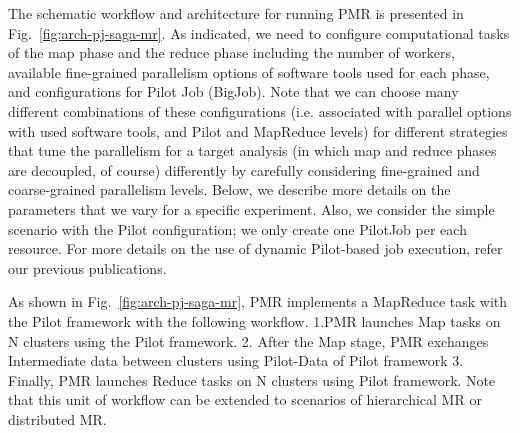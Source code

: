 \documentclass{acm_proc_article-sp}
\begin{document}
The schematic workflow and architecture for running PMR is presented in Fig.~\ref{fig:arch-pj-saga-mr}.  As indicated, we need to configure computational tasks of the map phase and the reduce phase including the number of workers, available fine-grained parallelism options of software tools used for each phase, and configurations for Pilot Job (BigJob).  Note that we can choose many different combinations of these configurations (i.e. associated with parallel options with used software tools, and Pilot and MapReduce levels) for different strategies that tune the parallelism for a target analysis (in which map and reduce phases are decoupled, of course) differently by carefully considering fine-grained and coarse-grained parallelism levels.  Below, we describe more details on the parameters that we vary for a specific experiment.  Also, we consider the simple scenario with the Pilot configuration; we only create one PilotJob per each resource. For more details on the use of dynamic Pilot-based job execution, refer our previous publications\cite{dare-ecmls11,dare-tg11,repex_ptrsa}.    

As shown in Fig.~\ref{fig:arch-pj-saga-mr}, PMR implements a MapReduce task with the Pilot framework\cite{pmr2012} with the following workflow. 1.PMR launches Map tasks on N clusters using the Pilot framework. 2. After the Map stage, PMR exchanges Intermediate data between clusters using Pilot-Data of Pilot framework  3. Finally, PMR launches Reduce tasks on N clusters using Pilot framework.  Note that this unit of workflow can be extended to scenarios of hierarchical MR or distributed MR\cite{pmr2012}.  
\end{document}
